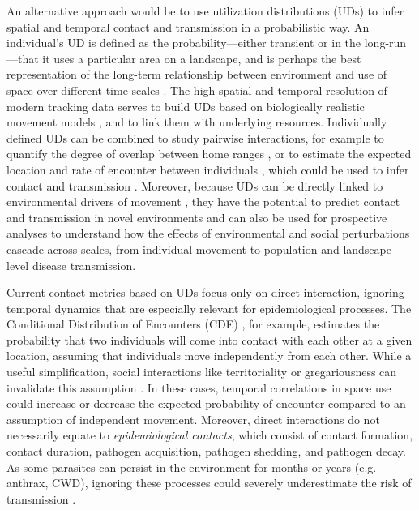 \documentclass[letterpaper]{article}
\begin{document}
An alternative approach would be to use utilization distributions (UDs) to infer spatial and temporal contact and transmission in a probabilistic way. An individual's UD is defined as the probability---either transient or in the long-run \citep{Tao2016}---that it uses a particular area on a landscape, and is perhaps the best representation of the long-term relationship between environment and use of space over different time scales \citet{Webber2023}. The high spatial and temporal resolution of modern tracking data serves to build UDs based on biologically realistic movement models \citep{Fleming2014,Gurarie2011,Potts2023}, and to link them with underlying resources.
Individually defined UDs can be combined to study pairwise interactions, for example to quantify the degree of overlap between home ranges \citep{Winner2018}, or to estimate the expected location and rate of encounter between individuals  \citep{Noonan2021}, which could be used to infer contact and transmission \citep{Godfrey2010, Godfrey2013}. 
Moreover, because UDs can be directly linked to environmental drivers of movement \citep{Signer2017}, they have the potential to predict contact and transmission in novel environments and can also be used for prospective analyses to understand how the effects of environmental and social perturbations cascade across scales, from individual movement to population and landscape-level disease transmission. 

Current contact metrics based on UDs focus only on direct interaction, ignoring temporal dynamics that are especially relevant for epidemiological processes. The Conditional Distribution of Encounters (CDE) \citep{Noonan2021}, for example, estimates the probability that two individuals will come into contact with each other at a given location, assuming that individuals move independently from each other.
While a useful simplification, social interactions like territoriality or gregariousness can invalidate this assumption  \citep{Manlove2018,Sah2018}. In these cases, temporal correlations in space use could increase or decrease the expected probability of encounter compared to an assumption of independent movement. 
Moreover, direct interactions do not necessarily equate to \emph{epidemiological contacts}, which consist of contact formation, contact duration, pathogen acquisition, pathogen shedding, and pathogen decay. As some parasites can persist in the environment for months or years (e.g. anthrax, CWD), ignoring these processes could severely underestimate the risk of transmission \citep{Wilber2022,Yang2023,Richardson2015}.
\end{document}
